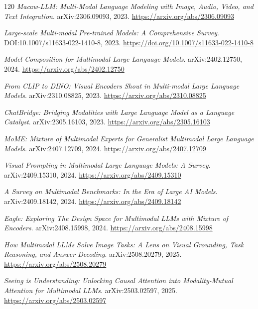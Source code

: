 \documentclass[11pt,a4paper]{article}
\begin{document}
\begin{thebibliography}{120}
\newblock \emph{Macaw-LLM: Multi-Modal Language Modeling with Image, Audio, Video, and Text Integration}.
\newblock arXiv:2306.09093, 2023.
\newblock \url{https://arxiv.org/abs/2306.09093}

\newblock \emph{Large-scale Multi-modal Pre-trained Models: A Comprehensive Survey}.
\newblock DOI:10.1007/s11633-022-1410-8, 2023.
\newblock \url{https://doi.org/10.1007/s11633-022-1410-8}

\newblock \emph{Model Composition for Multimodal Large Language Models}.
\newblock arXiv:2402.12750, 2024.
\newblock \url{https://arxiv.org/abs/2402.12750}

\newblock \emph{From CLIP to DINO: Visual Encoders Shout in Multi-modal Large Language Models}.
\newblock arXiv:2310.08825, 2023.
\newblock \url{https://arxiv.org/abs/2310.08825}

\newblock \emph{ChatBridge: Bridging Modalities with Large Language Model as a Language Catalyst}.
\newblock arXiv:2305.16103, 2023.
\newblock \url{https://arxiv.org/abs/2305.16103}

\newblock \emph{MoME: Mixture of Multimodal Experts for Generalist Multimodal Large Language Models}.
\newblock arXiv:2407.12709, 2024.
\newblock \url{https://arxiv.org/abs/2407.12709}

\newblock \emph{Visual Prompting in Multimodal Large Language Models: A Survey}.
\newblock arXiv:2409.15310, 2024.
\newblock \url{https://arxiv.org/abs/2409.15310}

\newblock \emph{A Survey on Multimodal Benchmarks: In the Era of Large AI Models}.
\newblock arXiv:2409.18142, 2024.
\newblock \url{https://arxiv.org/abs/2409.18142}

\newblock \emph{Eagle: Exploring The Design Space for Multimodal LLMs with Mixture of Encoders}.
\newblock arXiv:2408.15998, 2024.
\newblock \url{https://arxiv.org/abs/2408.15998}

\newblock \emph{How Multimodal LLMs Solve Image Tasks: A Lens on Visual Grounding, Task Reasoning, and Answer Decoding}.
\newblock arXiv:2508.20279, 2025.
\newblock \url{https://arxiv.org/abs/2508.20279}

\newblock \emph{Seeing is Understanding: Unlocking Causal Attention into Modality-Mutual Attention for Multimodal LLMs}.
\newblock arXiv:2503.02597, 2025.
\newblock \url{https://arxiv.org/abs/2503.02597}


\end{thebibliography}
\end{document}
